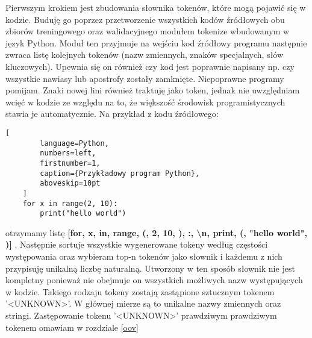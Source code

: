 Pierwszym krokiem jest zbudowania słownika tokenów, które mogą pojawić się w kodzie. Buduję go poprzez przetworzenie wszystkich kodów źródłowych obu zbiorów treningowego oraz 
walidacyjnego modułem tokenize \cite{tokenize} wbudowanym w język Python. Moduł ten przyjmuje na wejściu kod źródłowy programu następnie zwraca listę kolejnych tokenów (nazw zmiennych, 
znaków specjalnych, słów kluczowych). Upewnia się on również czy kod jest poprawnie napisany np. czy wszystkie nawiasy lub apostrofy zostały zamknięte. Niepoprawne programy pomijam. 
Znaki nowej lini również traktuję jako token, jednak nie uwzględniam wcięć w kodzie ze względu na to, że większość środowisk programistycznych stawia je 
automatycznie. Na przykład z kodu źródłowego: 
\begin{addmargin}[10mm]{0mm}
    \begin{lstlisting}[
        language=Python,
        numbers=left,
        firstnumber=1,
        caption={Przykładowy program Python},
        aboveskip=10pt
    ]
    for x in range(2, 10): 
        print("hello world")
    \end{lstlisting}
    \end{addmargin}
otrzymamy listę \textbf{ [for, x, in, range, (, 2, 10, ), :, \textbackslash n, print, (, "hello world", )] }.
Następnie sortuje wszystkie wygenerowane tokeny według częstości występowania oraz wybieram top-n tokenów jako słownik i każdemu z nich przypisuję unikalną liczbę naturalną. 
Utworzony w ten sposób słownik nie jest kompletny ponieważ nie obejmuje on wszystkich możliwych nazw występujących w kodzie. Takiego rodzaju tokeny
zostają zastąpione sztucznym tokenem '<UNKNOWN>'. W głównej mierze są to unikalne nazwy zmiennych oraz stringi. Zastępowanie tokenu '<UNKNOWN>' prawdziwym prawdziwym tokenem omawiam w 
rozdziale \ref{oov}

